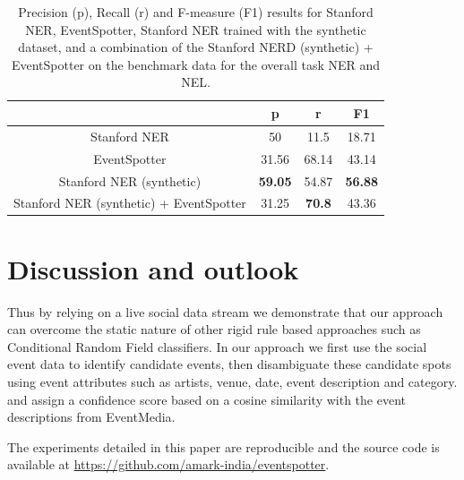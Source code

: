 \documentclass[10pt,a4paper]{article}
\begin{document}
\begin{table}[h]
\centering %
\begin{tabular}{c c c c} %
\hline %
& p & r & F1 \\ [0.5ex] %
\hline\hline %
Stanford NER & 50 & 11.5 & 18.71 \\
EventSpotter & 31.56 & 68.14 & 43.14 \\
Stanford NER (synthetic) & \textbf{59.05} & 54.87 & \textbf{56.88} \\
Stanford NER (synthetic) + EventSpotter & 31.25 & \textbf{70.8} & 43.36 \\
\hline %
\end{tabular}
\caption{Precision (p), Recall (r) and F-measure (F1) results for Stanford NER, EventSpotter, Stanford NER trained with the synthetic dataset, and a combination of the Stanford NERD (synthetic) + EventSpotter on the benchmark data for the overall task NER and NEL.} %
\label{tab:manual} %
\end{table}


\section{Discussion and outlook}
Thus by relying on a live social data stream we demonstrate that our approach can overcome the static nature of other rigid rule based approaches such as Conditional Random Field classifiers. In our approach we first use the social event data to identify candidate events, then disambiguate these candidate spots using event attributes such as artists, venue, date, event description and category. and assign a confidence score based on a cosine similarity with the event descriptions from EventMedia. 

{\color{red}{G:Outlook.}}

The experiments detailed in this paper are reproducible and the source code is available at \url{https://github.com/amark-india/eventspotter}. 




\end{document}
